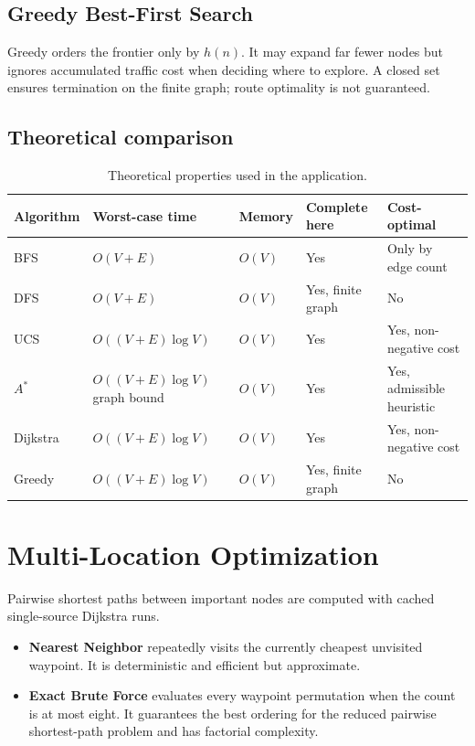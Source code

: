 \documentclass[12pt,a4paper]{article}
\begin{document}
\subsection{Greedy Best-First Search}

Greedy orders the frontier only by $h(n)$. It may expand far fewer nodes but
ignores accumulated traffic cost when deciding where to explore. A closed set
ensures termination on the finite graph; route optimality is not guaranteed.

\subsection{Theoretical comparison}

\begin{table}[H]
    \centering
    \caption{Theoretical properties used in the application.}
    \label{tab:theory}
    \renewcommand{\arraystretch}{1.12}
    \scriptsize
    \begin{tabularx}{\textwidth}{P{1.8cm} P{3.1cm} P{2.4cm} P{2.7cm} Y}
        \toprule
        \textbf{Algorithm} & \textbf{Worst-case time} & \textbf{Memory} &
        \textbf{Complete here} & \textbf{Cost-optimal} \\
        \midrule
        BFS & $O(V+E)$ & $O(V)$ & Yes & Only by edge count \\
        DFS & $O(V+E)$ & $O(V)$ & Yes, finite graph & No \\
        UCS & $O((V+E)\log V)$ & $O(V)$ & Yes & Yes, non-negative cost \\
        $A^*$ & $O((V+E)\log V)$ graph bound & $O(V)$ & Yes & Yes, admissible heuristic \\
        Dijkstra & $O((V+E)\log V)$ & $O(V)$ & Yes & Yes, non-negative cost \\
        Greedy & $O((V+E)\log V)$ & $O(V)$ & Yes, finite graph & No \\
        \bottomrule
    \end{tabularx}
\end{table}

\section{Multi-Location Optimization}

Pairwise shortest paths between important nodes are computed with cached
single-source Dijkstra runs.

\begin{itemize}
    \item \textbf{Nearest Neighbor} repeatedly visits the currently cheapest
          unvisited waypoint. It is deterministic and efficient but approximate.
    \item \textbf{Exact Brute Force} evaluates every waypoint permutation when
          the count is at most eight. It guarantees the best ordering for the
          reduced pairwise shortest-path problem and has factorial complexity.
\end{itemize}
\end{document}
